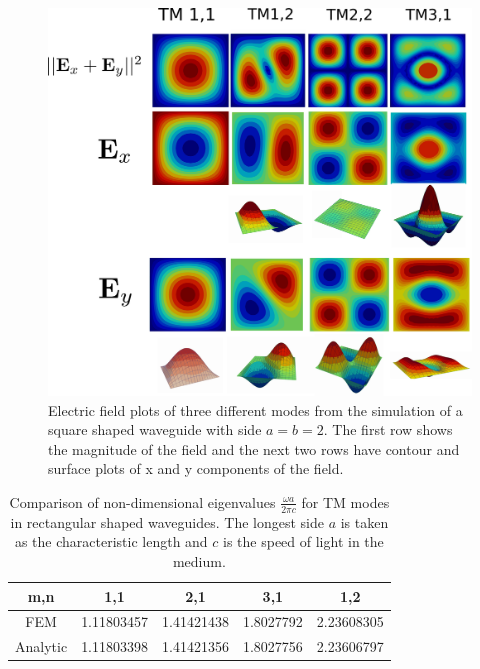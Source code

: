 \begin{figure}
\centering
\includegraphics[scale=0.1]{./img/square_waveguide.pdf}
\caption{Electric field plots of three different  modes from the simulation of a square shaped waveguide with side $a=b=2$. The first row shows the magnitude of the field and the next two rows have contour and surface plots of x and y components of the field.}
\label{fig:square_waveguide}
\end{figure}

\begin{table}
\begin{center}
\begin{tabular}{|c|c|c|c|c|}
\hline 
m,n & 1,1 & 2,1 & 3,1 & 1,2 \\ 
\hline 
FEM      & 1.11803457 & 1.41421438 & 1.8027792 &  2.23608305 \\
\hline 
Analytic & 1.11803398 & 1.41421356 & 1.8027756 &  2.23606797 \\
\hline 
\end{tabular} 
\caption{Comparison of non-dimensional eigenvalues $\frac{\omega a}{2\pi c}$ for TM modes in  rectangular shaped waveguides. The longest side $a$ is taken as the characteristic length and $c$ is the speed of light in the medium.}
\label{tab:rec_wav_comparison}
\end{center}
\end{table}

